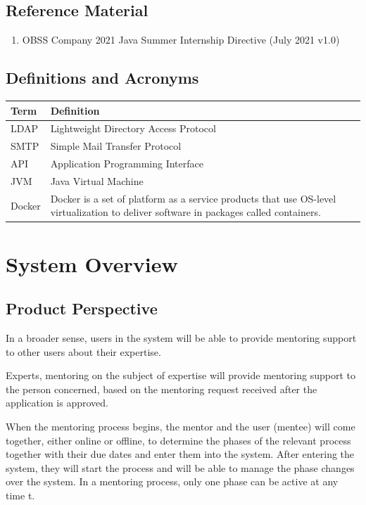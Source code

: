 \documentclass[10pt]{article}
\begin{document}
\subsection{Reference Material} \label{reference_material}
\begin{enumerate}
    \item OBSS Company 2021 Java Summer Internship Directive (July 2021 v1.0)
\end{enumerate} 


\subsection{Definitions and Acronyms} \label{definitions_and_acronyms}
\begin{table}[h]
    \centering
    \begin{tabularx}{\textwidth}{|l|X|}
    \hline
    \textbf{Term} & \textbf{Definition} \\ \hline
    LDAP    &  Lightweight Directory Access Protocol    \\ \hline
    SMTP & Simple Mail Transfer Protocol \\ \hline
    API & Application Programming Interface \\ \hline
    JVM & Java Virtual Machine \\ \hline
    Docker & Docker is a set of platform as a service products that use OS-level virtualization to deliver software in packages called containers. \\ \hline
    \end{tabularx}
    \label{tab:terms}
\end{table}
\newpage


\section{System Overview} \label{system_overview}

\subsection{Product Perspective} \label{product_perspective}
In a broader sense, users in the system will be able to provide mentoring support to
other users about their expertise.

Experts, mentoring on the subject of expertise will provide mentoring support to the
person concerned, based on the mentoring request received after the application is
approved.

When the mentoring process begins, the mentor and the user (mentee) will come together,
either online or offline, to determine the phases of the relevant process together with
their due dates and enter them into the system. After entering the system, they will
start the process and will be able to manage the phase changes over the system. In a
mentoring process, only one phase can be active at any time t.
\end{document}

